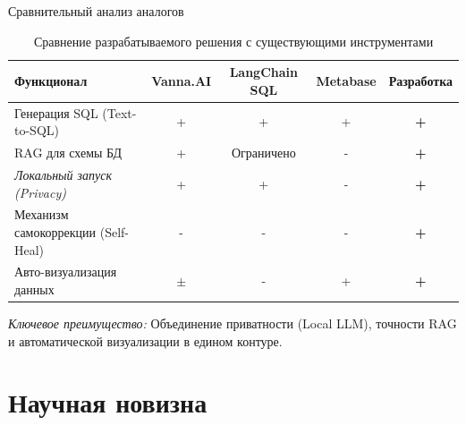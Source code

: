 \documentclass[10pt, aspectratio=169, unicode]{beamer}
\begin{document}
\begin{frame}{Сравнительный анализ аналогов}
    \begin{table}[h!]
        \centering
        \caption{Сравнение разрабатываемого решения с существующими инструментами}
        \label{table:comparison}
        \small
        \begin{tabular}{|l|c|c|c|c|}
        \hline
        \textbf{Функционал} & \textbf{Vanna.AI} & \textbf{LangChain SQL} & \textbf{Metabase} & \textbf{Разработка} \\ \hline
        Генерация SQL (Text-to-SQL) & + & + & + & \textbf{+} \\ \hline
        RAG для схемы БД & + & Ограничено & - & \textbf{+} \\ \hline
        \textit{Локальный запуск (Privacy)} & + & + & - & \textbf{+} \\ \hline
        Механизм самокоррекции (Self-Heal) & - & - & - & \textbf{+} \\ \hline
        Авто-визуализация данных & $\pm$ & - & + & \textbf{+} \\ \hline
        \end{tabular}
    \end{table}
    
    \footnotesize{\textit{Ключевое преимущество:} Объединение приватности (Local LLM), точности RAG и автоматической визуализации в едином контуре.}
\end{frame}






\section{Научная новизна}

\end{document}
